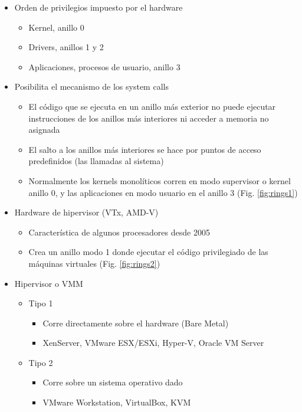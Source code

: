 \begin{itemize}
	\item Orden de privilegios impuesto por el hardware
		\begin{itemize}
		\item Kernel, anillo 0
		\item Drivers, anillos 1 y 2		
		\item Aplicaciones, procesos de usuario, anillo 3
	\end{itemize}
	\item Posibilita el mecanismo de los system calls
	\begin{itemize}
	\item El código que se ejecuta en un anillo más exterior no puede ejecutar instrucciones de los anillos más interiores ni acceder a memoria no asignada 
	\item El salto a los anillos más interiores se hace por puntos de acceso predefinidos (las llamadas al sistema)	
	\item Normalmente los kernels monolíticos corren en modo supervisor o kernel anillo 0, y las aplicaciones en modo usuario en el anillo 3 (Fig. \ref{fig:rings1})
	\end{itemize}
	\item Hardware de hipervisor (VTx, AMD-V)
	\begin{itemize}
		\item Característica de algunos procesadores desde 2005
		\item Crea un anillo modo 1 donde ejecutar el código privilegiado de las máquinas virtuales (Fig. \ref{fig:rings2})
	\end{itemize}
	\item Hipervisor o VMM
	\begin{itemize}
		\item Tipo 1
		\begin{itemize}
			\item Corre directamente sobre el hardware (Bare Metal)
			\item XenServer, VMware ESX/ESXi, Hyper-V, Oracle VM Server
		\end{itemize}		
		\item Tipo 2
		\begin{itemize}
			\item Corre sobre un sistema operativo dado
			\item VMware Workstation, VirtualBox, KVM
		\end{itemize}
	\end{itemize}
\end{itemize}

